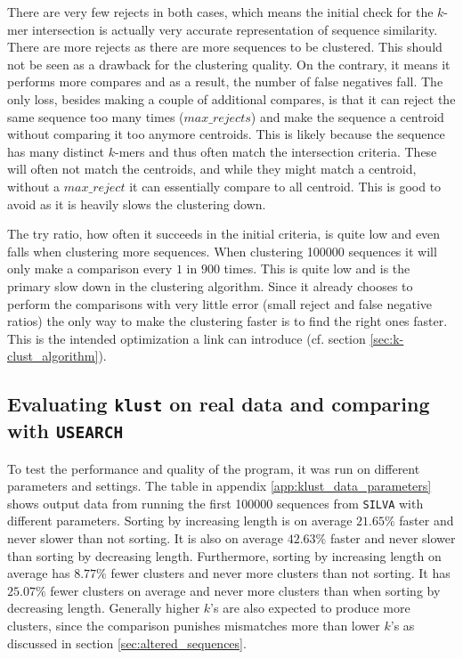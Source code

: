 There are very few rejects in both cases, which means the initial check for
the $k$-mer intersection is actually very accurate representation of sequence
similarity. There are more rejects as there are more sequences to be
clustered. This should not be seen as a drawback for the clustering quality.
On the contrary, it means it performs more compares and as a result, the
number of false negatives fall. The only loss, besides making a couple of
additional compares, is that it can reject the same sequence too many times
($max\_rejects$) and make the sequence a centroid without comparing it too
anymore centroids. This is likely because the sequence has many distinct
$k$-mers and thus often match the intersection criteria. These will often not
match the centroids, and while they might match a centroid, without a
$max\_reject$ it can essentially compare to all centroid. This is good to
avoid as it is heavily slows the clustering down.

The try ratio, how often it succeeds in the initial criteria, is quite low and
even falls when clustering more sequences. When clustering \num{100000}
sequences it will only make a comparison every $1$ in $900$ times. This is
quite low and is the primary slow down in the clustering algorithm. Since it
already chooses to perform the comparisons with very little error (small
reject and false negative ratios) the only way to make the clustering faster
is to find the right ones faster. This is the intended optimization a link can
introduce (cf. section \ref{sec:k-clust_algorithm}).


\subsection{Evaluating \texttt{klust} on real data and comparing with
            \texttt{USEARCH}}
\label{sec:evaluating_klust_real_data}

To test the performance and quality of the program, it was run on different
parameters and settings. The table in appendix \ref{app:klust_data_parameters}
shows output data from running the first \num{100000} sequences from
\texttt{SILVA} with different parameters. Sorting by increasing length is on
average $21.65\%$ faster and never slower than not sorting. It is also on
average $42.63\%$ faster and never slower than sorting by decreasing length.
Furthermore, sorting by increasing length on average has $8.77\%$ fewer
clusters and never more clusters than not sorting. It has $25.07\%$ fewer
clusters on average and never more clusters than when sorting by decreasing
length. Generally higher $k$'s are also expected to produce more clusters,
since the comparison punishes mismatches more than lower $k$'s as discussed in
section \ref{sec:altered_sequences}.

